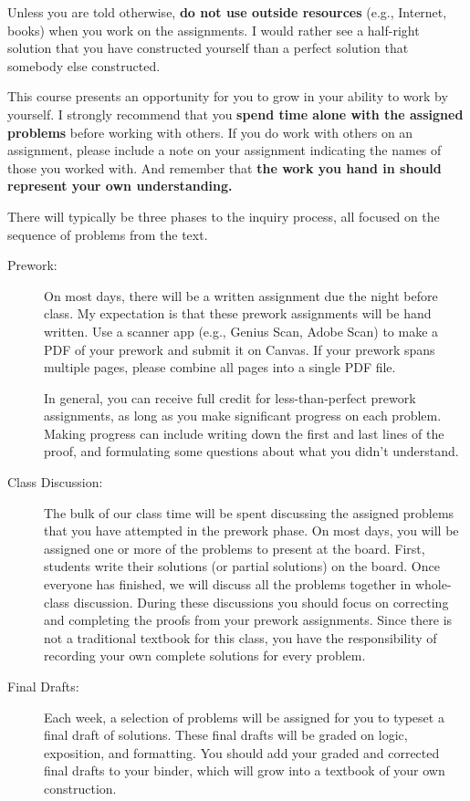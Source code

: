 \documentclass[
  twoside]{article}
\begin{document}
Unless you are told otherwise, \textbf{do not use outside resources}
(e.g., Internet, books) when you work on the assignments. I would rather
see a half-right solution that you have constructed yourself than a
perfect solution that somebody else constructed.

This course presents an opportunity for you to grow in your ability to
work by yourself. I strongly recommend that you
\textbf{spend time alone with the assigned problems} before working with
others. If you do work with others on an assignment, please include a
note on your assignment indicating the names of those you worked with.
And remember that
\textbf{the work you hand in should represent your own understanding.}

There will typically be three phases to the inquiry process, all focused
on the sequence of problems from the text.

\begin{description}
          \item[Prework:] On most days, there will be a written assignment due the night before class. My expectation is that these prework assignments will be hand written. Use a scanner app (e.g., Genius Scan, Adobe Scan) to make a PDF of your prework and submit it on Canvas. If your prework spans multiple pages, please combine all pages into a single PDF file.
          
In general, you can receive full credit for less-than-perfect prework assignments, as long as you make significant progress on each problem.  Making progress can include writing down the first and last lines of the proof, and formulating some questions about what you didn't understand.
          \item[Class Discussion:] The bulk of our class time will be spent discussing the assigned problems that you have attempted in the prework phase. On most days, you will be assigned one or more of the problems to present at the board. First,  students write their solutions (or partial solutions) on the board. Once everyone has finished, we will discuss all the problems together in whole-class discussion. During these discussions you should focus on correcting and completing the proofs from your prework assignments. Since there is not a traditional textbook for this class, you have the responsibility of recording your own complete solutions for every problem.
          \item[Final Drafts:]  Each week, a selection of problems will be assigned for you to typeset a final draft of solutions. These final drafts will be graded on logic, exposition, and formatting. You should add your graded and corrected final drafts to your binder, which will grow into a textbook of your own construction.
      \end{description}
\end{document}
